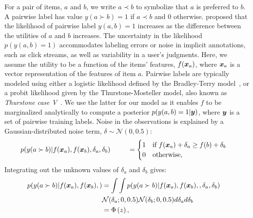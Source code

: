 For a pair of items, $a$ and $b$, we write $a \prec b$ to symbolize that $a$ is preferred to $b$.  
A pairwise label has value $y(a \succ b) =1 $ if $a \prec b$ and $0$ otherwise.
\citet{thurstone1927law} proposed that the likelihood of pairwise label $y(a,b)=1$ 
increases as the difference between the utilities of $a$ and $b$ increases. 
The uncertainty in the likelihood $p(y(a,b)=1)$ accommodates
 labeling errors or noise in implicit annotations, such as click streams, as well as variability in a user's judgments.
Here, we assume the utility to be a function of the items' features,
$f(\boldsymbol x_a)$, where $\boldsymbol x_a$ is a vector representation of the features of item $a$.
Pairwise labels are typically modeled using either a logistic likelihood %
defined by the Bradley-Terry model~\citep{bradley1952rank,plackett1975analysis,luce1959possible},
or a probit likelihood given by the Thurstone-Mosteller model, also known as \emph{Thurstone case V}~\citep{thurstone1927law,mosteller2006remarks}.
We use the latter for our model as it enables $f$ to be marginalized analytically to compute a posterior $p(y(a,b)=1 | \boldsymbol y)$,
where $\boldsymbol y$ is a set of pairwise training labels.
Noise in the observations is explained by a Gaussian-distributed noise term, $\delta \sim \mathcal{N}(0, 0.5)$:
\begin{align}
 p(y(a \succ b) | f(\boldsymbol x_a), f(\boldsymbol x_b), \delta_{a}, \delta_{b} )  
 \hspace{0.9cm} & = \begin{cases}
 1 & \text{if }f(\boldsymbol x_a) + \delta_{a} \geq f(b) + \delta_{b} \\
 0 & \text{otherwise,}
 \end{cases} &
 \label{eq:thurstone}
\end{align}
Integrating out the unknown values of $\delta_a$ and $\delta_b$ gives:
\begin{align}
p( y(a \succ b) | f(\boldsymbol x_a), f(\boldsymbol x_b),  ) 
& = \int\int p( y(a \succ b) | f(\boldsymbol x_a), f(\boldsymbol x_b), , \delta_{a}, \delta_{b} ) & \nonumber\\
& \mathcal{N}(\delta_{a}; 0, 0.5)\mathcal{N}(\delta_{b}; 0, 0.5) d\delta_{a} d\delta_{b} &\nonumber\\
& = \Phi\left( z \right), 
\label{eq:plphi}
\end{align}
